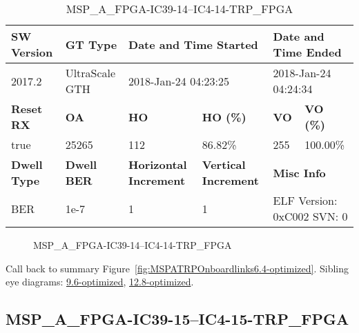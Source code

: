 \begin{table}[h]
\centering
\caption{MSP\_A\_FPGA-IC39-14--IC4-14-TRP\_FPGA}
\label{tab:MSPAFPGAIC3914IC414TRPFPGA6.4-optimized}
\begin{tabular}{@{}|l|l|l|l|l|l|@{}}
\toprule
\textbf{SW Version}                & \textbf{GT Type}   & \multicolumn{2}{l|}{\textbf{Date and Time Started}}            & \multicolumn{2}{l|}{\textbf{Date and Time Ended}}        \\ \midrule
2017.2                       & UltraScale GTH          & \multicolumn{2}{l|}{2018-Jan-24 04:23:25}                   & \multicolumn{2}{l|}{2018-Jan-24 04:24:34}               \\ \midrule
\textbf{Reset RX}                  & \textbf{OA} & \textbf{HO}   & \textbf{HO (\%)} & \textbf{VO} & \textbf{VO (\%)} \\ \midrule
true & 25265        & 112          & 86.82\%        & 255        & 100.00\%       \\ \midrule
\textbf{Dwell Type}                & \textbf{Dwell BER} & \textbf{Horizontal Increment} & \textbf{Vertical Increment}    & \multicolumn{2}{l|}{\textbf{Misc Info}}                  \\ \midrule
BER                            & 1e-7        & 1        & 1           & \multicolumn{2}{l|}{ELF Version: 0xC002 SVN: 0}                         \\ \bottomrule
\end{tabular}
\end{table}

\begin{figure}[h]
\caption{MSP\_A\_FPGA-IC39-14--IC4-14-TRP\_FPGA} \label{fig:MSPAFPGAIC3914IC414TRPFPGA6.4-optimized}
\end{figure}

Call back to summary Figure~\ref{fig:MSPATRPOnboardlinks6.4-optimized}.
Sibling eye diagrams: \hyperref[sec:MSPAFPGAIC3914IC414TRPFPGA9.6-optimized]{9.6-optimized}, \hyperref[sec:MSPAFPGAIC3914IC414TRPFPGA12.8-optimized]{12.8-optimized}.

\clearpage
\newpage


\subsection{MSP\_A\_FPGA-IC39-15--IC4-15-TRP\_FPGA}\label{sec:MSPAFPGAIC3915IC415TRPFPGA6.4-optimized}

